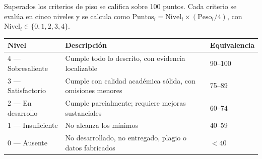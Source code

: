 \documentclass[11pt,a4paper]{article}
\begin{document}
	Superados los criterios de piso se califica sobre 100 puntos. Cada criterio se evalúa en cinco niveles y se calcula como $\text{Puntos}_i = \text{Nivel}_i \times (\text{Peso}_i/4)$, con $\text{Nivel}_i \in \{0,1,2,3,4\}$.
	
	\begin{center}
		\small
		\begin{tabular}{@{}p{2.2cm}p{9.0cm}p{3.4cm}@{}}
			\toprule
			\textbf{Nivel} & \textbf{Descripción} & \textbf{Equivalencia} \\
			\midrule
			4 --- Sobresaliente & Cumple todo lo descrito, con evidencia localizable & 90--100 \\
			3 --- Satisfactorio & Cumple con calidad académica sólida, con omisiones menores & 75--89 \\
			2 --- En desarrollo & Cumple parcialmente; requiere mejoras sustanciales & 60--74 \\
			1 --- Insuficiente & No alcanza los mínimos & 40--59 \\
			0 --- Ausente & No desarrollado, no entregado, plagio o datos fabricados & $<40$ \\
			\bottomrule
		\end{tabular}
	\end{center}
	
\end{document}
